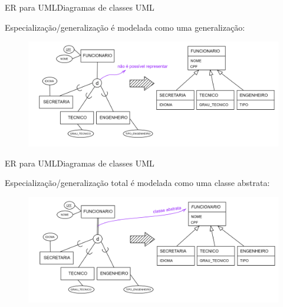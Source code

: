 \documentclass[t]{beamer}
\begin{document}

\begin{ftst}{ER para UML}{Diagramas de classes UML}

Especialização/generalização é modelada como uma generalização:

\vone
\begin{figure}
    \centering
    \includegraphics[scale=0.12]{Figuras/UML_8.png}

\end{figure}
\end{ftst}


\begin{ftst}{ER para UML}{Diagramas de classes UML}

Especialização/generalização total é modelada como uma classe abstrata:

\vone
\begin{figure}
    \centering
    \includegraphics[scale=0.12]{Figuras/UML_9.png}

\end{figure}
\end{ftst}

\end{document}
